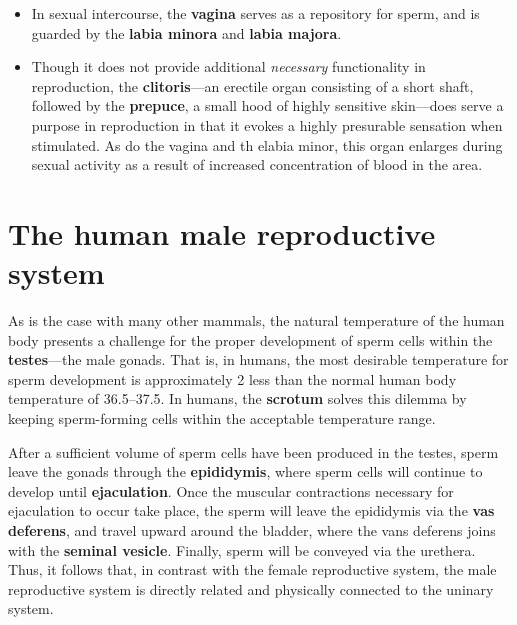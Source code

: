 \documentclass{article}
\begin{document}
\begin{itemize}
	\item In sexual intercourse, the \textbf{vagina} serves as a repository for sperm, and
		is guarded by the \textbf{labia minora} and \textbf{labia majora}.
	\item Though it does not provide additional \emph{necessary} functionality in
		reproduction, the \textbf{clitoris}---an erectile organ consisting of a short shaft,
		followed by the \textbf{prepuce}, a small hood of highly sensitive skin---does serve
		a purpose in reproduction in that it evokes a highly presurable sensation when
		stimulated. As do the vagina and th elabia minor, this organ enlarges during sexual
		activity as a result of increased concentration of blood in the area.
\end{itemize}

\section{The human male reproductive system}

As is the case with many other mammals, the natural temperature of the human body presents a
challenge for the proper development of sperm cells within the \textbf{testes}---the male
gonads. That is, in humans, the most desirable temperature for sperm development is
approximately 2 less than the normal human body temperature of
36.5--37.5. In humans, the \textbf{scrotum} solves this dilemma by keeping
sperm-forming cells within the acceptable temperature range.

After a sufficient volume of sperm cells have been produced in the testes, sperm leave
the gonads through the \textbf{epididymis}, where sperm cells will continue to develop
until \textbf{ejaculation}. Once the muscular contractions necessary for ejaculation to
occur take place, the sperm will leave the epididymis via the \textbf{vas deferens}, and
travel upward around the bladder, where the vans deferens joins with the \textbf{seminal
vesicle}. Finally, sperm will be conveyed via the urethera. Thus, it follows that, in
contrast with the female reproductive system, the male reproductive system is
directly related and physically connected to the uninary system.
\end{document}
